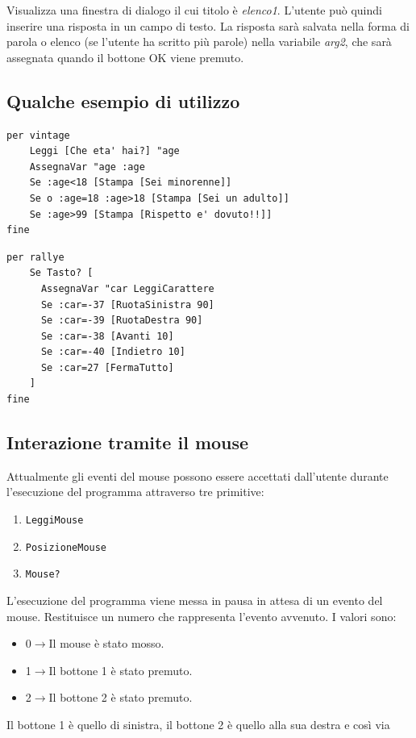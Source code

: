 Visualizza una finestra di dialogo il cui titolo è \textit{elenco1}. L'utente può quindi inserire una risposta in un campo di testo. La risposta sarà salvata nella forma di parola o elenco (se l'utente ha scritto più parole) nella variabile \textit{arg2}, che sarà assegnata quando il bottone OK viene premuto.

\subsection{Qualche esempio di utilizzo}

\begin{lstlisting}[caption="Richiesta di una risposta dall'utente"]
per vintage
	Leggi [Che eta' hai?] "age
	AssegnaVar "age :age
	Se :age<18 [Stampa [Sei minorenne]]
	Se o :age=18 :age>18 [Stampa [Sei un adulto]]
	Se :age>99 [Stampa [Rispetto e' dovuto!!]]
fine
\end{lstlisting}

\begin{lstlisting}[caption="L'utente controlla la tartaruga"]
per rallye
	Se Tasto? [
	  AssegnaVar "car LeggiCarattere
	  Se :car=-37 [RuotaSinistra 90]
	  Se :car=-39 [RuotaDestra 90]
	  Se :car=-38 [Avanti 10]
	  Se :car=-40 [Indietro 10]
	  Se :car=27 [FermaTutto]
	]
fine
\end{lstlisting}



\subsection{Interazione tramite il mouse}
Attualmente gli eventi del mouse possono essere accettati dall'utente durante l'esecuzione del programma attraverso tre primitive:
\begin{enumerate}
	\item \texttt{LeggiMouse}
	\item \texttt{PosizioneMouse}
	\item \texttt{Mouse?}
\end{enumerate}

L'esecuzione del programma viene messa in pausa in attesa di un evento del mouse. Restituisce un numero che rappresenta l'evento avvenuto. I valori sono:
\begin{itemize}
 \item 0$\to$Il mouse è stato mosso.
 \item 1$\to$Il bottone 1 è stato premuto.
 \item 2$\to$Il bottone 2 è stato premuto.
\end{itemize}
Il bottone 1 è quello di sinistra, il bottone 2 è quello alla sua destra e così via \textellipsis\\

